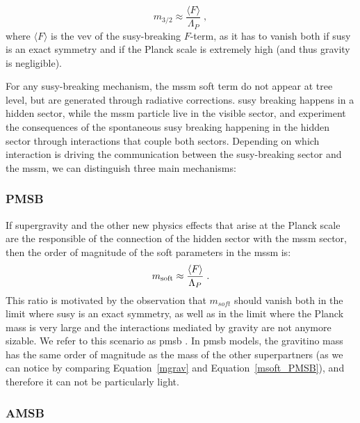 \begin{equation}
m_{3/2} \approx \frac{\langle F \rangle}{\Lambda_P} \; ,
\label{mgrav}
\end{equation}
\noindent where $\langle F \rangle$ is the \gls{vev} of the \gls{susy}-breaking $F$-term, as it has to vanish both if \gls{susy} is an exact symmetry and if the Planck scale is extremely high (and thus gravity is negligible). 

For any \gls{susy}-breaking mechanism, the \gls{mssm} soft term do not appear at tree level, but are generated through radiative corrections. \gls{susy} breaking happens in a hidden sector, while the \gls{mssm} particle live in the visible sector, and experiment the consequences of the spontaneous \gls{susy} breaking happening in the hidden sector through interactions that couple both sectors. Depending on which interaction is driving the communication between the \gls{susy}-breaking sector and the \gls{mssm}, we can distinguish three main mechanisms:

\subsubsection*{PMSB} 

If supergravity and the other new physics effects that arise at the Planck scale are the responsible of the connection of the hidden sector with the \gls{mssm} sector, then the order of magnitude of the soft parameters in the \gls{mssm} is:
\begin{equation}
m_{\rm{soft}} \approx \frac{\langle F \rangle}{\Lambda_P} \; .
\label{msoft_PMSB}
\end{equation}
\noindent This ratio is motivated by the observation that $m_{soft}$ should vanish both in the limit where \gls{susy} is an exact symmetry, as well as in the limit where the Planck mass is very large and the interactions mediated by gravity are not anymore sizable. We refer to this scenario as \gls{pmsb} \cite{PhysRevLett.49.970, BARBIERI1982343, IBANEZ198273, PhysRevD.27.2359}. In \gls{pmsb} models, the gravitino mass has the same order of magnitude as the mass of the other superpartners (as we can notice by comparing Equation~\ref{mgrav} and Equation~\ref{msoft_PMSB}), and therefore it can not be particularly light. 

\subsubsection*{AMSB}

